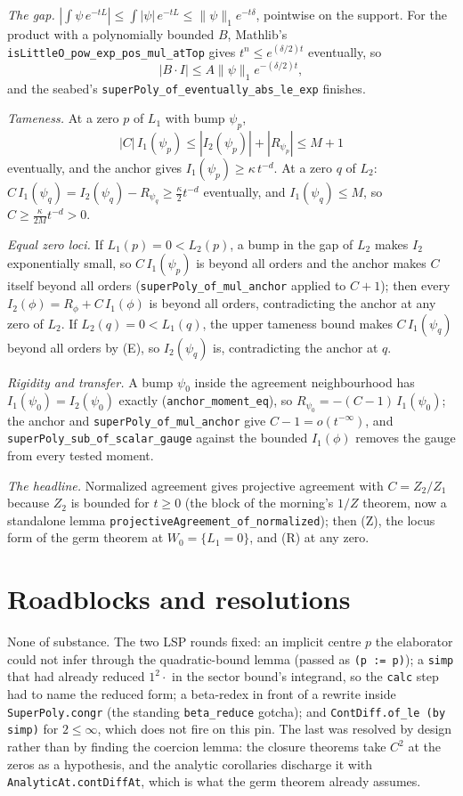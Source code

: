 \documentclass[11pt]{article}
\newcommand{\code}[1]{\texttt{#1}}
\begin{document}
\emph{The gap.} $|\int\psi\,e^{-tL}| \le \int|\psi|\,e^{-tL} \le
\|\psi\|_1 e^{-t\delta}$, pointwise on the support. For the product
with a polynomially bounded $B$, Mathlib's
\code{isLittleO\_pow\_exp\_pos\_mul\_atTop} gives $t^n \le
e^{(\delta/2)t}$ eventually, so
\[|B\cdot I| \le A\|\psi\|_1 e^{-(\delta/2)t},\]
and the seabed's
\code{superPoly\_of\_eventually\_abs\_le\_exp} finishes.

\emph{Tameness.} At a zero $p$ of $L_1$ with bump $\psi_p$,
\[|C|\,I_1(\psi_p) \le |I_2(\psi_p)| + |R_{\psi_p}| \le M + 1\]
eventually, and the anchor gives $I_1(\psi_p) \ge \kappa\,t^{-d}$. At a zero $q$ of
$L_2$: $C\,I_1(\psi_q) = I_2(\psi_q) - R_{\psi_q} \ge \tfrac{\kappa}{2}
t^{-d}$ eventually, and $I_1(\psi_q) \le M$, so $C \ge
\tfrac{\kappa}{2M}t^{-d} > 0$.

\emph{Equal zero loci.} If $L_1(p) = 0 < L_2(p)$, a bump in the gap of
$L_2$ makes $I_2$ exponentially small, so $C\,I_1(\psi_p)$ is beyond all
orders and the anchor makes $C$ itself beyond all orders
(\code{superPoly\_of\_mul\_anchor} applied to $C + 1$); then every
$I_2(\phi) = R_\phi + C\,I_1(\phi)$ is beyond all orders, contradicting
the anchor at any zero of $L_2$. If $L_2(q) = 0 < L_1(q)$, the upper
tameness bound makes $C\,I_1(\psi_q)$ beyond all orders by (E), so
$I_2(\psi_q)$ is, contradicting the anchor at $q$.

\emph{Rigidity and transfer.} A bump $\psi_0$ inside the agreement
neighbourhood has $I_1(\psi_0) = I_2(\psi_0)$ exactly
(\code{anchor\_moment\_eq}), so $R_{\psi_0} = -(C - 1)\,I_1(\psi_0)$;
the anchor and \code{superPoly\_of\_mul\_anchor} give $C - 1 =
o(t^{-\infty})$, and \code{superPoly\_sub\_of\_scalar\_gauge} against
the bounded $I_1(\phi)$ removes the gauge from every tested moment.

\emph{The headline.} Normalized agreement gives projective agreement
with $C = Z_2/Z_1$ because $Z_2$ is bounded for $t \ge 0$ (the block of
the morning's $1/Z$ theorem, now a standalone lemma
\code{projectiveAgreement\_of\_normalized}); then (Z), the locus form of
the germ theorem at $W_0 = \{L_1 = 0\}$, and (R) at any zero.

\section{Roadblocks and resolutions}

None of substance. The two LSP rounds fixed: an implicit centre $p$ the
elaborator could not infer through the quadratic-bound lemma (passed as
\code{(p := p)}); a \code{simp} that had already reduced $1^2\cdot$ in
the sector bound's integrand, so the \code{calc} step had to name the
reduced form; a beta-redex in front of a rewrite inside
\code{SuperPoly.congr} (the standing \code{beta\_reduce} gotcha); and
\code{ContDiff.of\_le (by simp)} for $2 \le \infty$, which does not fire
on this pin. The last was resolved by design rather than by finding the
coercion lemma: the closure theorems take $C^2$ at the zeros as a
hypothesis, and the analytic corollaries discharge it with
\code{AnalyticAt.contDiffAt}, which is what the germ theorem already
assumes.
\end{document}
